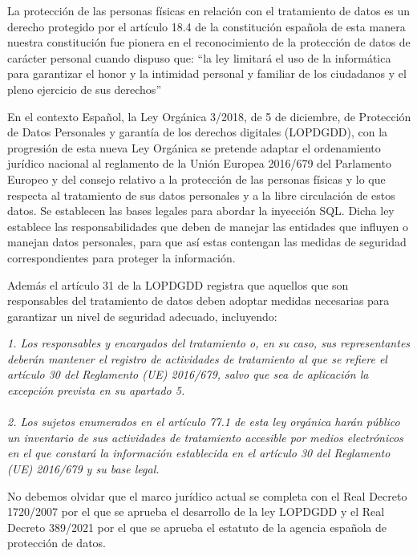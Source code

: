 \documentclass[11pt]{report}
\begin{document}
La protección de las personas físicas en relación con el tratamiento de datos es un derecho protegido por el artículo 18.4 de la constitución 
española de esta manera nuestra constitución fue pionera en el reconocimiento de la protección de datos de carácter personal cuando dispuso que: 
“la ley limitará el uso de la informática para garantizar el honor y la intimidad personal y familiar de los ciudadanos y el pleno ejercicio de sus derechos”

En el contexto Español, la Ley Orgánica 3/2018, de 5 de diciembre, de Protección de Datos Personales y garantía de los derechos digitales (LOPDGDD), 
con la progresión de esta nueva Ley Orgánica se pretende adaptar el ordenamiento jurídico nacional al reglamento de la Unión Europea 2016/679 del 
Parlamento Europeo y del consejo relativo a la protección de las personas físicas y lo que respecta al tratamiento de sus datos personales y a la 
libre circulación de estos datos. Se establecen las bases legales para abordar la inyección SQL. Dicha ley establece las responsabilidades que deben
de manejar las entidades que influyen o manejan datos personales, para que así estas contengan las medidas de seguridad correspondientes para proteger la información.

Además el artículo 31 de la LOPDGDD registra que aquellos que son responsables del tratamiento de datos deben adoptar medidas necesarias para garantizar
un nivel de seguridad adecuado, incluyendo:

\emph{1. Los responsables y encargados del tratamiento o, en su caso, sus representantes deberán mantener el registro de actividades de tratamiento al que se refiere el 
artículo 30 del Reglamento (UE) 2016/679, salvo que sea de aplicación la excepción prevista en su apartado 5.}
\\ \\
\emph{2. Los sujetos enumerados en el artículo 77.1 de esta ley orgánica harán público un inventario de sus actividades de tratamiento accesible por medios electrónicos
en el que constará la información establecida en el artículo 30 del Reglamento (UE) 2016/679 y su base legal.}

No debemos olvidar que el marco jurídico actual se completa con el Real Decreto 1720/2007 por el que se aprueba el desarrollo de la ley LOPDGDD y el Real Decreto 389/2021 
por el que se aprueba el estatuto de la agencia española de protección de datos.

\cleardoublepage
\end{document}
